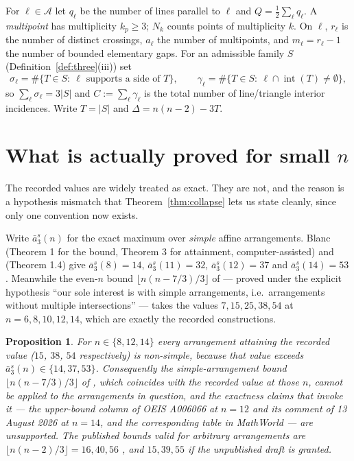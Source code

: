 \documentclass[11pt]{article}
\newtheorem{proposition}[theorem]{Proposition}
\theoremstyle{definition}
\newcommand{\Nk}{N_k}
\newcommand{\intr}{\operatorname{int}}
\begin{document}
For $\ell\in\mathcal A$ let $q_\ell$ be the number of lines parallel to
$\ell$ and $Q=\frac12\sum_\ell q_\ell$. A \emph{multipoint} has multiplicity
$k_p\ge3$; $\Nk$ counts points of multiplicity $k$. On $\ell$, $r_\ell$ is
the number of distinct crossings, $a_\ell$ the number of multipoints, and
$m_\ell=r_\ell-1$ the number of bounded elementary gaps. For an admissible
family $S$ (Definition~\ref{def:three}(iii)) set
\[
 \sigma_\ell=\#\{T\in S:\ \ell\text{ supports a side of }T\},\qquad
 \gamma_\ell=\#\{T\in S:\ \ell\cap\intr(T)\ne\emptyset\},
\]
so $\sum_\ell\sigma_\ell=3|S|$ and $C:=\sum_\ell\gamma_\ell$ is the total
number of line/triangle interior incidences. Write $T=|S|$ and
$\Delta=n(n-2)-3T$.

\section{What is actually proved for small $n$}\label{sec:actual}

The recorded values are widely treated as exact. They are not, and the
reason is a hypothesis mismatch that Theorem~\ref{thm:collapse} lets us state
cleanly, since only one convention now exists.

Write $\bar a_3^s(n)$ for the exact maximum over \emph{simple} affine
arrangements. Blanc \cite{Blanc} (Theorem 1 for the bound, Theorem 3 for
attainment, computer-assisted) and \cite{BBL} (Theorem 1.4) give
$\bar a_3^s(8)=14$, $\bar a_3^s(11)=32$, $\bar a_3^s(12)=37$ and
$\bar a_3^s(14)=53$. Meanwhile the even-$n$ bound $\lfloor
n(n-7/3)/3\rfloor$ of \cite[Thm.~1.1]{BBL} --- proved under the explicit
hypothesis ``our sole interest is with simple arrangements, i.e.\
arrangements without multiple intersections'' --- takes the values
$7,15,25,38,54$ at $n=6,8,10,12,14$, which are exactly the recorded
constructions.

\begin{proposition}\label{prop:mismatch}
For $n\in\{8,12,14\}$ every arrangement attaining the recorded value
($15$, $38$, $54$ respectively) is non-simple, because that value exceeds
$\bar a_3^s(n)\in\{14,37,53\}$. Consequently the simple-arrangement bound
$\lfloor n(n-7/3)/3\rfloor$ of \cite[Thm.~1.1]{BBL}, which coincides with the
recorded value at those $n$, cannot be applied to the arrangements in
question, and the exactness claims that invoke it --- the upper-bound column
of OEIS A006066 \cite{OEIS} at $n=12$ and its comment of 13 August 2026 at
$n=14$, and the corresponding table in MathWorld \cite{MW} --- are
unsupported. The published bounds valid for arbitrary arrangements are
$\lfloor n(n-2)/3\rfloor=16,40,56$ \cite{FK1999}, and $15,39,55$ if the
unpublished draft \cite{CB2007} is granted.
\end{proposition}
\end{document}
